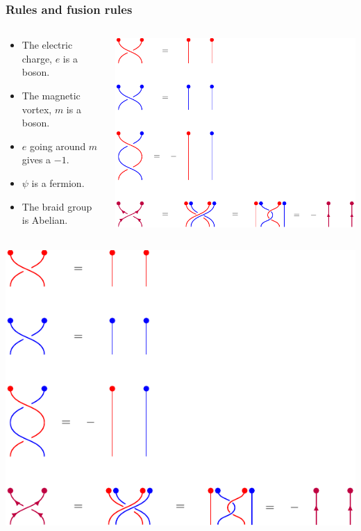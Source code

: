 \documentclass{beamer}
\renewcommand{\(}{\left(}
\renewcommand{\)}{\right)}
\renewcommand{\[}{\left[}
\renewcommand{\]}{\right]}
\begin{document}
\begin{frame}
    \frametitle{Rules and fusion rules}
    \begin{columns}
        \begin{column}{0.6\textwidth}
            \begin{itemize}
                \item The electric charge, $e$ is a boson. 
                \item The magnetic vortex, $m$ is a boson. 
                \item $e$ going around $m$ gives a $-1$. 
                \item $\psi$ is a fermion.
                \item The braid group is Abelian. 
            \end{itemize}
        \end{column}
        \begin{column}{0.4\textwidth}
            \includegraphics[scale=0.9, trim=0 60 170 0, clip]{rules_of_braiding.pdf}
        \end{column}
    \end{columns}
    \vspace{10pt}
    \includegraphics[scale=1, trim=0 0 0 190, clip]{rules_of_braiding.pdf}
\end{frame}
\end{document}
